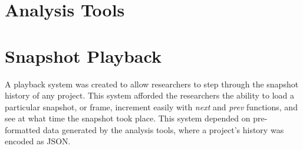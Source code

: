 




\section{Analysis Tools} \label{sec:analysis-tools}


\section{Snapshot Playback}
\label{sec:playback}

A playback system was created to allow researchers to step through the snapshot history of any project. This system afforded the researchers the ability to load a particular snapshot, or frame, increment easily with \emph{next} and \emph{prev} functions, and see at what time the snapshot took place. This system depended on pre-formatted data generated by the analysis tools, where a project's history was encoded as JSON.

